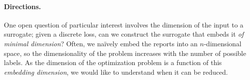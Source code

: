 \documentclass[12pt]{article}
\newcommand{\Comments}{1}
\newcommand{\mynote}[2]{\ifnum\Comments=1\textcolor{#1}{#2}\fi}
\newcommand{\jessie}[1]{\mynote{purple}{[JF: #1]}}
\newcommand{\reals}{\mathbb{R}}
\begin{document}
%
%


\paragraph{Directions.}
One open question of particular interest involves the dimension of the input to a surrogate; given a discrete loss, can we construct the surrogate that embeds it \emph{of minimal dimension}?
Often, we na\"ively embed the reports into an $n$-dimensional space, so the dimensionality of the problem increases with the number of possible labels.
As the dimension of the optimization problem is a function of this \emph{embedding dimension},  we would like to understand when it can be reduced.
\end{document}
